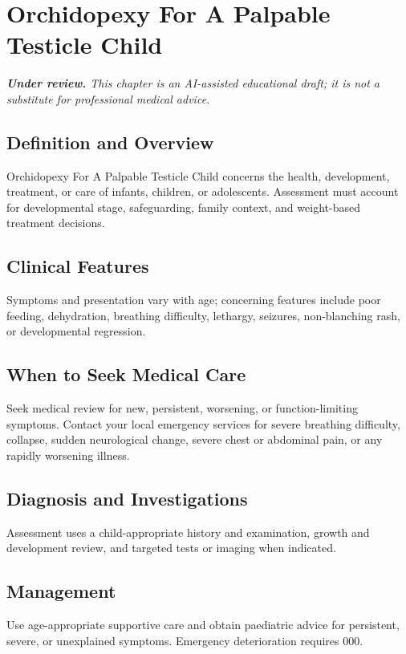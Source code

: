 \chapter{Orchidopexy For A Palpable Testicle Child}

\medskip
\noindent\textit{\textbf{Under review.} This chapter is an AI-assisted educational draft; it is not a substitute for professional medical advice.}

\section*{Definition and Overview}
Orchidopexy For A Palpable Testicle Child concerns the health, development, treatment, or care of infants, children, or adolescents. Assessment must account for developmental stage, safeguarding, family context, and weight-based treatment decisions.

\section*{Clinical Features}
Symptoms and presentation vary with age; concerning features include poor feeding, dehydration, breathing difficulty, lethargy, seizures, non-blanching rash, or developmental regression.

\section*{When to Seek Medical Care}
Seek medical review for new, persistent, worsening, or function-limiting symptoms. Contact your local emergency services for severe breathing difficulty, collapse, sudden neurological change, severe chest or abdominal pain, or any rapidly worsening illness.

\section*{Diagnosis and Investigations}
Assessment uses a child-appropriate history and examination, growth and development review, and targeted tests or imaging when indicated.

\section*{Management}
Use age-appropriate supportive care and obtain paediatric advice for persistent, severe, or unexplained symptoms. Emergency deterioration requires 000.

